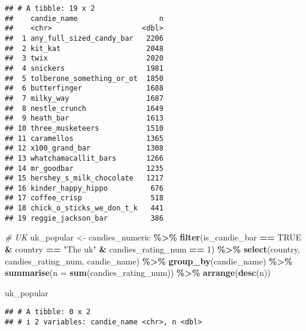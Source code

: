 \documentclass[
]{article}
\newenvironment{Shaded}{\begin{snugshade}}{\end{snugshade}}
\newcommand{\AttributeTok}[1]{\textcolor[rgb]{0.13,0.29,0.53}{#1}}
\newcommand{\CommentTok}[1]{\textcolor[rgb]{0.56,0.35,0.01}{\textit{#1}}}
\newcommand{\ConstantTok}[1]{\textcolor[rgb]{0.56,0.35,0.01}{#1}}
\newcommand{\DecValTok}[1]{\textcolor[rgb]{0.00,0.00,0.81}{#1}}
\newcommand{\FunctionTok}[1]{\textcolor[rgb]{0.13,0.29,0.53}{\textbf{#1}}}
\newcommand{\NormalTok}[1]{#1}
\newcommand{\OtherTok}[1]{\textcolor[rgb]{0.56,0.35,0.01}{#1}}
\newcommand{\SpecialCharTok}[1]{\textcolor[rgb]{0.81,0.36,0.00}{\textbf{#1}}}
\newcommand{\StringTok}[1]{\textcolor[rgb]{0.31,0.60,0.02}{#1}}
\begin{document}
\begin{verbatim}
## # A tibble: 19 x 2
##    candie_name                   n
##    <chr>                     <dbl>
##  1 any_full_sized_candy_bar   2206
##  2 kit_kat                    2048
##  3 twix                       2020
##  4 snickers                   1981
##  5 tolberone_something_or_ot  1850
##  6 butterfinger               1688
##  7 milky_way                  1687
##  8 nestle_crunch              1649
##  9 heath_bar                  1613
## 10 three_musketeers           1510
## 11 caramellos                 1365
## 12 x100_grand_bar             1308
## 13 whatchamacallit_bars       1266
## 14 mr_goodbar                 1235
## 15 hershey_s_milk_chocolate   1217
## 16 kinder_happy_hippo          676
## 17 coffee_crisp                518
## 18 chick_o_sticks_we_don_t_k   441
## 19 reggie_jackson_bar          386
\end{verbatim}

\begin{Shaded}
\begin{Highlighting}[]
\CommentTok{\# UK}
\NormalTok{uk\_popular }\OtherTok{\textless{}{-}}\NormalTok{ candies\_numeric }\SpecialCharTok{\%\textgreater{}\%} 
  \FunctionTok{filter}\NormalTok{(is\_candie\_bar }\SpecialCharTok{==} \ConstantTok{TRUE} \SpecialCharTok{\&}\NormalTok{ country }\SpecialCharTok{==} \StringTok{"The uk"} \SpecialCharTok{\&}\NormalTok{ candies\_rating\_num }\SpecialCharTok{==} \DecValTok{1}\NormalTok{) }\SpecialCharTok{\%\textgreater{}\%} 
  \FunctionTok{select}\NormalTok{(country, candies\_rating\_num, candie\_name) }\SpecialCharTok{\%\textgreater{}\%}
  \FunctionTok{group\_by}\NormalTok{(candie\_name) }\SpecialCharTok{\%\textgreater{}\%} 
  \FunctionTok{summarise}\NormalTok{(}\AttributeTok{n =} \FunctionTok{sum}\NormalTok{(candies\_rating\_num)) }\SpecialCharTok{\%\textgreater{}\%} 
  \FunctionTok{arrange}\NormalTok{(}\FunctionTok{desc}\NormalTok{(n))}

\NormalTok{uk\_popular}
\end{Highlighting}
\end{Shaded}

\begin{verbatim}
## # A tibble: 0 x 2
## # i 2 variables: candie_name <chr>, n <dbl>
\end{verbatim}
\end{document}

